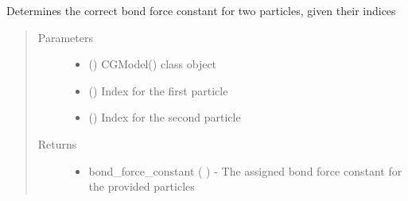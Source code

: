 \documentclass[letterpaper,12pt,english,openany,oneside]{sphinxmanual}
\begin{document}
\begin{fulllineitems}
\begin{fulllineitems}
\label{\detokenize{cg_model:cg_model.cgmodel.CGModel.get_bond_force_constant}}
Determines the correct bond force constant for two particles, given their indices
\begin{quote}\begin{description}
\item[{Parameters}] \leavevmode\begin{itemize}
\item {} 
 () \textendash{} CGModel() class object

\item {} 
 () \textendash{} Index for the first particle

\item {} 
 () \textendash{} Index for the second particle

\end{itemize}

\item[{Returns}] \leavevmode
\begin{itemize}
\item {} 
bond\_force\_constant (  ) - The assigned bond force constant for the provided particles

\end{itemize}


\end{description}\end{quote}

\end{fulllineitems}



\end{fulllineitems}
\end{document}
